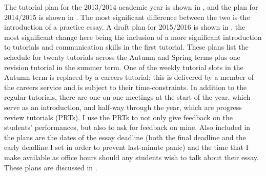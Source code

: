 The tutorial plan for the 2013/2014 academic year is shown in , and the plan for 2014/2015 is shown in . The most significant difference between the two is the introduction of a practice essay. A draft plan for 2015/2016 is shown in , the most significant change here being the inclusion of a more significant introduction to tutorials and communication skills in the first tutorial. These plans list the schedule for twenty tutorials across the Autumn and Spring terms plus one revision tutorial in the summer term. One of the weekly tutorial slots in the Autumn term is replaced by a careers tutorial; this is delivered by a member of the careers service and is subject to their time-constraints. In addition to the regular tutorials, there are one-on-one meetings at the start of the year, which serve as an introduction, and half-way through the year, which are progress review tutorials (PRTs). I use the PRTs to not only give feedback on the students' performances, but also to ask for feedback on mine. Also included in the plans are the dates of the essay deadline (both the final deadline and the early deadline I set in order to prevent last-minute panic) and the time that I make available as office hours should any students wish to talk about their essay. These plans are discussed in .
